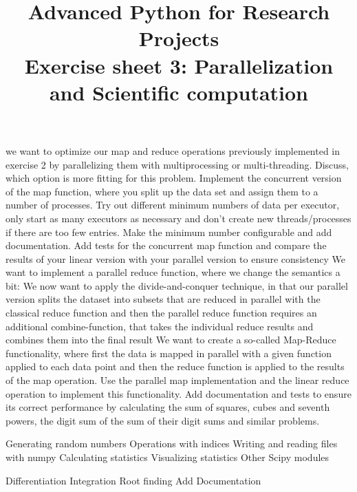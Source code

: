 \documentclass[]{erlangen-problemset}
\title{{\Large Advanced Python for Research Projects} \\[0.3cm] 
Exercise sheet 3: Parallelization and Scientific computation}
\begin{document}

\begin{problem}[title={Parallel operators}]
\noindent
\Question we want to optimize our map and reduce operations previously implemented in exercise 2 by parallelizing them with multiprocessing or multi-threading. Discuss, which option is more fitting for this problem.
\Question Implement the concurrent version of the map function, where you split up the data set and assign them to a number of processes. 
Try out different minimum numbers of data per executor, only start as many executors as necessary and don't create new threads/processes if there are too few entries. 
Make the minimum number configurable and add documentation. 
\Question Add tests for the concurrent map function and compare the results of your linear version with your parallel version to ensure consistency
\Question We want to implement a parallel reduce function, where we change the semantics a bit:
We now want to apply the divide-and-conquer technique, in that our parallel version splits the dataset into subsets that are reduced in parallel with the classical reduce function and then the parallel reduce function requires an additional combine-function, that takes the individual reduce results and combines them into the final result
\Question We want to create a so-called Map-Reduce functionality, where first the data is mapped in parallel with a given function applied to each data point and then the reduce function is applied to the results of the map operation. Use the parallel map implementation and the linear reduce operation to implement this functionality. 
Add documentation and tests to ensure its correct performance by calculating the sum of squares, cubes and seventh powers, the digit sum of the sum of their digit sums and similar problems.
\end{problem}

\begin{problem}[title={Using numpy and scipy for scientific calculation}]
\noindent
\Question Generating random numbers
\Question Operations with indices
\Question Writing and reading files with numpy
\Question Calculating statistics
\Question Visualizing statistics
\Question Other Scipy modules
\end{problem}

\begin{problem}[title={Rebuilding numpy and scipy functionality ourselves}]
\noindent
\Question Differentiation
\Question Integration
\Question Root finding
\Question Add Documentation
\end{problem}
\end{document}
